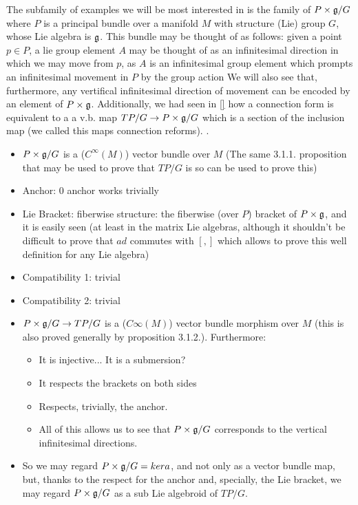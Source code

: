 The subfamily of examples we will be most interested in is the family of $P \times \mathfrak{g}/G$ where $P$ is a principal bundle over a manifold $M$ with structure (Lie) group $G$, whose Lie  algebra is $\mathfrak{g}$. This bundle may be thought of as follows: given a point $p \in P$, a lie group element $A$ may be thought of as an infinitesimal direction in which we may move from $p$, as $A$ is an infinitesimal group element which prompts an infinitesimal movement in $P$ by the group action We will also see that, furthermore, any vertifical infinitesimal direction of movement can be encoded by an element of $P \times \mathfrak{g}$. Additionally, we had seen in \ref{} how a connection form is equivalent to a  a v.b. map $TP/G \to P \times \mathfrak{g}/G$ which is a section of the inclusion map (we called this maps connection reforms). .


    \begin{itemize}
    \item $P \times \mathfrak{g}/G$ is a ($C^\infty(M)$) vector bundle over $M$ (The same 3.1.1. proposition that may be used to prove that $TP/G$ is so can be used to prove this)
    
    \item Anchor: $0$ anchor works trivially
    
    \item Lie Bracket: fiberwise structure: the fiberwise (over $P$) bracket of $P \times \mathfrak{g}$, and it is easily seen (at least in the matrix Lie algebras, although it shouldn't be difficult to prove that $ad$ commutes with $[,]$ which allows to prove this well definition for any Lie algebra)
    
    \item Compatibility 1: trivial
    
    \item Compatibility 2: trivial
    
    \item $P \times \mathfrak{g}/ G \to TP / G$ is a ($C\infty(M)$) vector bundle morphism over $M$ (this is also proved generally by proposition 3.1.2.). Furthermore:
        \begin{itemize}
        \item It is injective... It is a submersion?
        \item It respects the brackets on both sides
        \item Respects, trivially, the anchor.
        \item All of this allows us to see that $P \times \mathfrak{g}/G$ corresponds to the vertical infinitesimal directions.
        \end{itemize}
    
    \item So we may regard $P \times \mathfrak{g} / G = ker a$, and not only as a vector bundle map, but, thanks to the respect for the anchor and, specially, the Lie bracket, we may regard $P \times \mathfrak{g}/G$ as a sub Lie algebroid of $TP/G$.
    \end{itemize}

